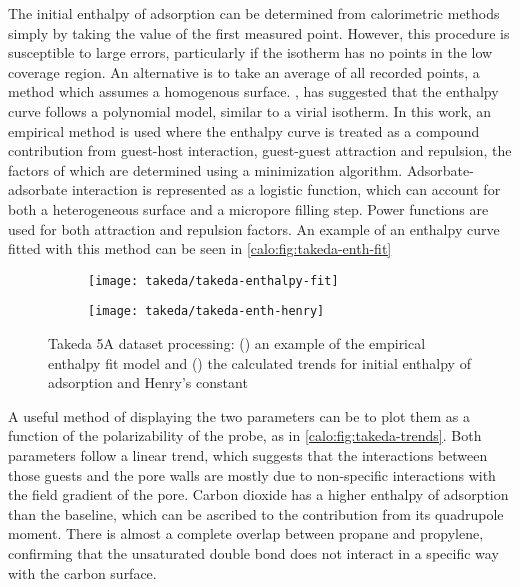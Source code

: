 The initial enthalpy of adsorption can be determined from calorimetric 
methods simply by taking the value of the first measured point.
However, this procedure is susceptible to large errors, particularly
if the isotherm has no points in the low coverage region. An alternative
is to take an average of all recorded points, a method which assumes
a homogenous surface. \citet{myersThermodynamicsAdsorptionPorous2002},
has suggested that the enthalpy curve follows a polynomial model, similar
to a virial isotherm.
In this work, an empirical method is used where the enthalpy curve
is treated as a compound contribution from guest-host interaction,
guest-guest attraction and repulsion, the factors of which are determined
using a minimization algorithm. Adsorbate-adsorbate interaction is 
represented as a logistic function, which can account for both 
a heterogeneous surface and a micropore filling step. Power functions
are used for both attraction and repulsion factors. An example of 
an enthalpy curve fitted with this method can be seen 
in \autoref{calo:fig:takeda-enth-fit}

\begin{figure}[ht]

	\centering
	\begin{subfigure}[b]{.5\textwidth}
		\centering
		\texttt{[image: takeda/takeda-enthalpy-fit]}
		\caption{}%
		\label{calo:fig:takeda-enth-fit}
	\end{subfigure}%
	\begin{subfigure}[b]{.5\textwidth}
		\centering
		\texttt{[image: takeda/takeda-enth-henry]}
		\caption{}%
		\label{calo:fig:takeda-trends}
	\end{subfigure}
	\caption{Takeda 5A dataset processing: (\protect{})
	 an example of the empirical enthalpy fit model and (\protect{}) the calculated
		trends for initial enthalpy of adsorption and Henry's constant}%
	\label{calo:fig:takeda-analysis}

\end{figure}

A useful method of displaying the two parameters can be to plot them
as a function of the polarizability of the probe, as in
\autoref{calo:fig:takeda-trends}. Both parameters follow a linear
trend, which suggests that the interactions between those guests and the
pore walls are mostly due to non-specific interactions with the field
gradient of the pore. Carbon dioxide has a higher enthalpy
of adsorption than the baseline, which can be ascribed to the contribution 
from its quadrupole moment. There is almost a complete overlap between 
propane and propylene, confirming that the unsaturated double bond does not
interact in a specific way with the carbon surface.


